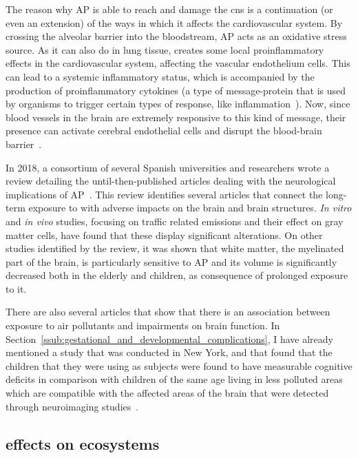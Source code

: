 The reason why \gls{AP} is able to reach and damage the \gls{cns} is a
continuation (or even an extension) of the ways in which it affects the
cardiovascular system. By crossing the alveolar barrier into the
bloodstream, \gls{AP} acts as an oxidative stress source. As it can also
do in lung tissue,  creates some local proinflammatory
effects in the cardiovascular system, affecting the vascular endothelium
cells. This can lead to a systemic inflammatory status, which is
accompanied by the production of proinflammatory cytokines (a type of
message-protein that is used by organisms to trigger certain types of
response, like inflammation~\cite{Zhang2007}). Now, since blood vessels in the
brain are extremely responsive to this kind of message, their presence
can activate cerebral endothelial cells and disrupt the blood-brain
barrier~\cite{Genc2012}.

In 2018, a consortium of several Spanish universities and researchers
wrote a review detailing the until-then-published articles dealing with
the neurological implications of \gls{AP}~\cite{DePradoBert2018}. This
review identifies several articles that connect the long-term exposure
to  with adverse impacts on the brain and brain structures.
\emph{In vitro} and \emph{in vivo} studies,  focusing on traffic related
emissions and their effect on gray matter cells, have found that these
display significant alterations. On other studies identified by the
review, it was shown that white matter, the myelinated part of the
brain, is particularly sensitive to \gls{AP} and its volume is
significantly decreased both in the elderly and children, as consequence
of prolonged exposure to it. 

There are also several articles that show that there is an association
between exposure to air pollutants and impairments on brain function.
In Section~\ref{ssub:gestational_and_developmental_complications},  I
have already mentioned a study that was conducted in New York, and that
found that the children that they were using as subjects were found to
have measurable cognitive deficits in comparison with children of the
same age living in less polluted areas which are compatible with the
affected areas of the brain that were detected through neuroimaging
studies~\cite{DePradoBert2018}.

\subsection{ effects on ecosystems}%
\label{sub:ap_effects_on_ecosystems}

